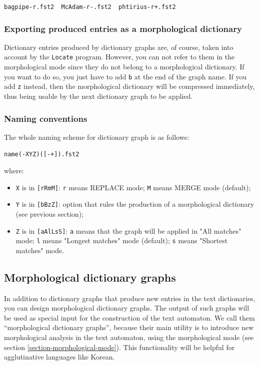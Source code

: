 \bigskip
\verb?bagpipe-r.fst2  McAdam-r-.fst2  phtirius-r+.fst2?

\subsubsection{Exporting produced entries as a morphological dictionary}
Dictionary entries produced by dictionary graphs are, of course, taken
into account by the \verb+Locate+ program. However, you can not refer to 
them in the morphological mode since they do not belong to a morphological 
dictionary. If you want to do so, you just have to add \verb+b+ at the end of
the graph name. If you add \verb+z+ instead, then the morphological dictionary
will be compressed immediately, thus being usable by the next dictionary graph 
to be applied.
 
\subsubsection{Naming conventions}
The whole naming scheme for dictionary graph is as follows:

\verb$name(-XYZ)([-+]).fst2$

\noindent where:
\begin{itemize}
\item \verb+X+ is in \verb+[rRmM]+: \verb+r+ means REPLACE mode; \verb+M+ means MERGE mode (default);
\item \verb+Y+ is in \verb+[bBzZ]+: option that rules the production of a morphological dictionary (see previous section);
\item \verb+Z+ is in \verb+[aAlLsS]+: \verb+a+ means that the graph will be applied in "All matches" mode; \verb+l+ means 
      "Longest matches" mode (default); \verb+s+ means "Shortest matches" mode.
\end{itemize}



\subsection{Morphological dictionary graphs}
In addition to dictionary graphs that produce new entries in the text
dictionaries, you can design morphological dictionary graphs. The output
of such graphs will be used as special input for the construction of the text
automaton. We call them ``morphological dictionary graphs'', because their
main utility is to introduce new morphological analysis in the text automaton,
using the morphological mode (see section \ref{section-morphological-mode}).
This functionality will be helpful for agglutinative languages like Korean.

